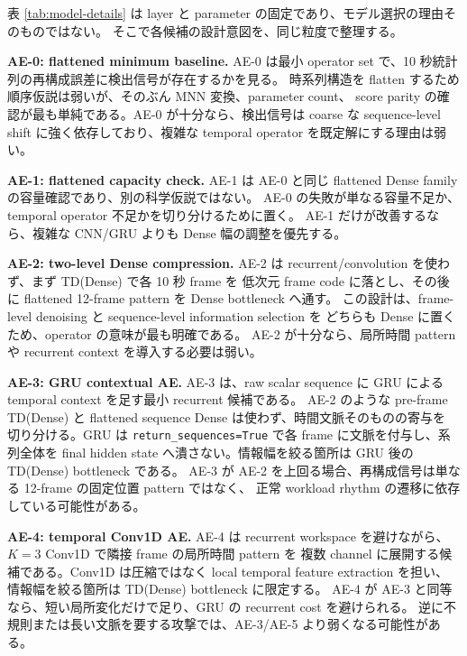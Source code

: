 表 \ref{tab:model-details} は layer と parameter の固定であり、モデル選択の理由そのものではない。
そこで各候補の設計意図を、同じ粒度で整理する。

\noindent\textbf{AE-0: flattened minimum baseline.}
AE-0 は最小 operator set で、10 秒統計列の再構成誤差に検出信号が存在するかを見る。
時系列構造を flatten するため順序仮説は弱いが、そのぶん MNN 変換、parameter count、
score parity の確認が最も単純である。AE-0 が十分なら、検出信号は coarse な
sequence-level shift に強く依存しており、複雑な temporal operator を既定解にする理由は弱い。

\noindent\textbf{AE-1: flattened capacity check.}
AE-1 は AE-0 と同じ flattened Dense family の容量確認であり、別の科学仮説ではない。
AE-0 の失敗が単なる容量不足か、temporal operator 不足かを切り分けるために置く。
AE-1 だけが改善するなら、複雑な CNN/GRU よりも Dense 幅の調整を優先する。

\noindent\textbf{AE-2: two-level Dense compression.}
AE-2 は recurrent/convolution を使わず、まず TD(Dense) で各 10 秒 frame を
低次元 frame code に落とし、その後に flattened 12-frame pattern を Dense bottleneck へ通す。
この設計は、frame-level denoising と sequence-level information selection を
どちらも Dense に置くため、operator の意味が最も明確である。
AE-2 が十分なら、局所時間 pattern や recurrent context を導入する必要は弱い。

\noindent\textbf{AE-3: GRU contextual AE.}
AE-3 は、raw scalar sequence に GRU による temporal context を足す最小 recurrent 候補である。
AE-2 のような pre-frame TD(Dense) と flattened sequence Dense は使わず、時間文脈そのものの寄与を
切り分ける。GRU は \texttt{return\_sequences=True} で各 frame に文脈を付与し、系列全体を final hidden state
へ潰さない。情報幅を絞る箇所は GRU 後の TD(Dense) bottleneck である。
AE-3 が AE-2 を上回る場合、再構成信号は単なる 12-frame の固定位置 pattern ではなく、
正常 workload rhythm の遷移に依存している可能性がある。

\noindent\textbf{AE-4: temporal Conv1D AE.}
AE-4 は recurrent workspace を避けながら、$K=3$ Conv1D で隣接 frame の局所時間 pattern を
複数 channel に展開する候補である。Conv1D は圧縮ではなく local temporal feature extraction を担い、
情報幅を絞る箇所は TD(Dense) bottleneck に限定する。
AE-4 が AE-3 と同等なら、短い局所変化だけで足り、GRU の recurrent cost を避けられる。
逆に不規則または長い文脈を要する攻撃では、AE-3/AE-5 より弱くなる可能性がある。

